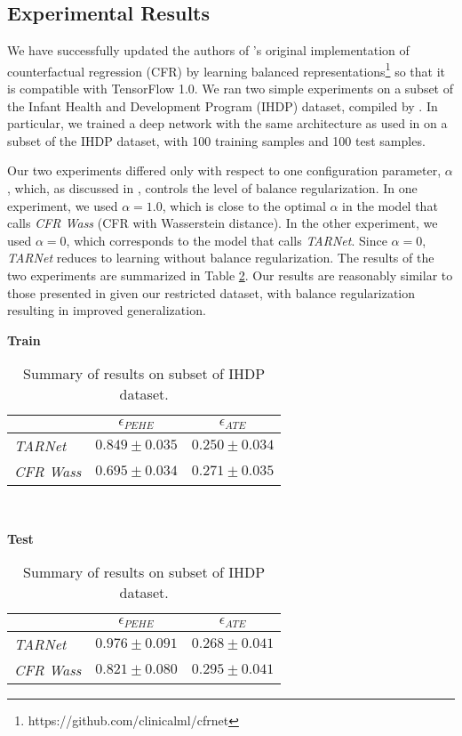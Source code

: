 \documentclass{article}
\begin{document}
\subsection{Experimental Results}
We have successfully updated the authors of \cite{johansson2016learning, shalit2017estimating}'s original implementation of counterfactual regression (CFR) by learning balanced representations\footnote{https://github.com/clinicalml/cfrnet} so that it is compatible with TensorFlow 1.0. 
We ran two simple experiments on a subset of the Infant Health and Development Program (IHDP) dataset, compiled by \cite{hill2011bayesian}.
In particular, we trained a deep network with the same architecture as used in \cite{shalit2017estimating} on a subset of the IHDP dataset, with 100 training samples and 100 test samples.

Our two experiments differed only with respect to one configuration parameter, $\alpha$, which, as discussed in \cite{shalit2017estimating}, controls the level of balance regularization.
In one experiment, we used $\alpha=1.0$, which is close to the optimal $\alpha$ in the model that \cite{shalit2017estimating} calls \textit{CFR Wass} (CFR with Wasserstein distance).  
In the other experiment, we used $\alpha=0$, which corresponds to the model that \cite{shalit2017estimating} calls \textit{TARNet}. Since $\alpha=0$, \textit{TARNet} reduces to learning without balance regularization.
The results of the two experiments are summarized in Table \ref{table1}.
Our results are reasonably similar to those presented in \cite{shalit2017estimating} given our restricted dataset, with balance regularization resulting in improved generalization.

\begin{table}[h!]
\hspace{105pt} \textbf{Train}
\begin{center}
\begin{tabular}{l|c|c}\hline
                  & $\epsilon_{PEHE}$ & $\epsilon_{ATE}$  \\\hline
\textit{TARNet}   & $0.849 \pm 0.035$ & $0.250 \pm 0.034$ \\
\textit{CFR Wass} & $0.695 \pm 0.034$ & $0.271 \pm 0.035$ \\\hline 
\end{tabular} \\
\end{center}

\hspace{105pt} \textbf{Test}
\begin{center}
\begin{tabular}{l|c|c}\hline
                  & $\epsilon_{PEHE}$ & $\epsilon_{ATE}$  \\\hline
\textit{TARNet}   & $0.976 \pm 0.091$ & $0.268 \pm 0.041$ \\
\textit{CFR Wass} & $0.821 \pm 0.080$ & $0.295 \pm 0.041$ \\\hline
\end{tabular}
\end{center}
\caption{Summary of results on subset of IHDP dataset.}
\vspace{-10pt}
\label{table1}
\end{table}
\end{document}
